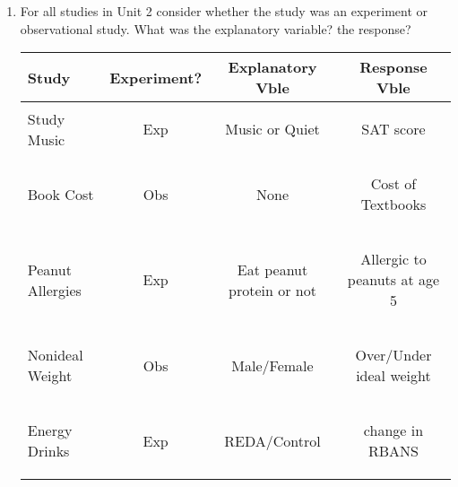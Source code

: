   \begin{enumerate}
  \item For all studies in Unit 2 consider whether the study was an
    experiment or observational study.  What was the explanatory
    variable? the response?\\
 \begin{tabular}{|l|c|c|c|}\hline
Study&Experiment?&Explanatory Vble&Response Vble\\ \hline
Study Music &
\begin{key}
  Exp
\end{key}
&
\begin{key}
  Music or Quiet
\end{key}
&
\begin{key}
  SAT score
\end{key}
\\ \hline
Book Cost &
\begin{key}
  Obs
\end{key}
&
\begin{key}
  None
\end{key}
&
\begin{key}
  Cost of Textbooks
\end{key}
\\ \hline
Peanut Allergies &
\begin{key}
  Exp
\end{key}
&
\begin{key}
  Eat peanut protein or not
\end{key}
&
\begin{key}
  Allergic to peanuts at age 5
\end{key}
\\ \hline
Nonideal Weight &
\begin{key}
  Obs
\end{key}
&
\begin{key}
  Male/Female
\end{key}
&
\begin{key}
  Over/Under ideal weight
\end{key}
\\ \hline
Energy Drinks &
\begin{key}
  Exp
\end{key}
&
\begin{key}
  REDA/Control
\end{key}
&
\begin{key}
  change in RBANS
\end{key}
\\ \hline

\end{tabular}
\end{enumerate}
